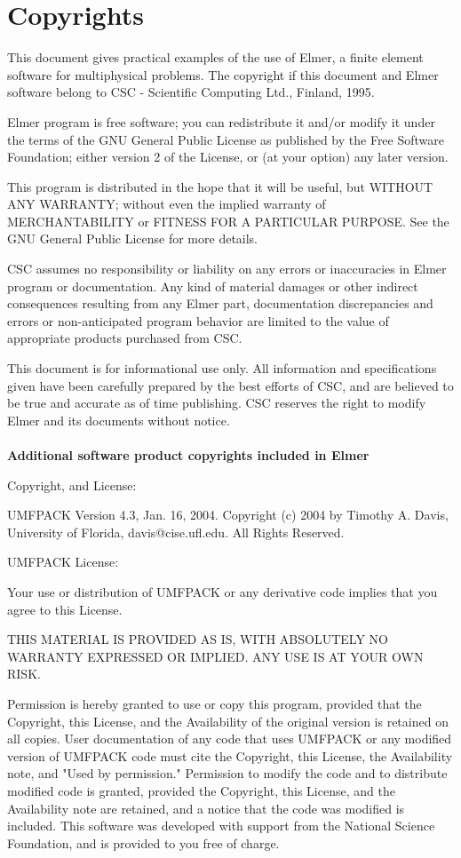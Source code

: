 \chapter*{Copyrights}

This document gives practical examples of the use of Elmer,
a finite element software for multiphysical problems.
The copyright if this document and Elmer software belong to
CSC - Scientific Computing Ltd., Finland, 1995. 

Elmer program is free software; you can redistribute it and/or
modify it under the terms of the GNU General Public License
as published by the Free Software Foundation; either version 2
of the License, or (at your option) any later version.

This program is distributed in the hope that it will be useful,
but WITHOUT ANY WARRANTY; without even the implied warranty of
MERCHANTABILITY or FITNESS FOR A PARTICULAR PURPOSE.  See the
GNU General Public License for more details.

CSC assumes no responsibility or liability on any errors or inaccuracies in 
Elmer program or documentation. Any kind of material damages or other indirect
consequences resulting from any Elmer part, documentation discrepancies and 
errors or non-anticipated program behavior are limited to the value of 
appropriate products purchased from CSC. 

This document is for informational use only. All information and specifications
given have been carefully prepared by the best efforts of CSC, and are believed
to be true and accurate as of time publishing. CSC reserves the right to 
modify Elmer and its documents without notice. \\  \mbox{} \\

\textbf{Additional software product copyrights included in Elmer}

Copyright, and License:

UMFPACK Version 4.3, Jan. 16, 2004. Copyright (c) 2004 by Timothy
A. Davis, University of Florida, davis@cise.ufl.edu. All Rights
Reserved. 


UMFPACK License: 

Your use or distribution of UMFPACK or any derivative code implies
that you agree to this License. 

      THIS MATERIAL IS PROVIDED AS IS, WITH ABSOLUTELY NO WARRANTY
      EXPRESSED OR IMPLIED. ANY USE IS AT YOUR OWN RISK. 

      Permission is hereby granted to use or copy this program,
      provided that the Copyright, this License, and the Availability
      of the original version is retained on all copies. User
      documentation of any code that uses UMFPACK or any modified
      version of UMFPACK code must cite the Copyright, this License,
      the Availability note, and "Used by permission." Permission to
      modify the code and to distribute modified code is granted,
      provided the Copyright, this License, and the Availability note
      are retained, and a notice that the code was modified is
      included. This software was developed with support from the
      National Science Foundation, and is provided to you free of
      charge. 


